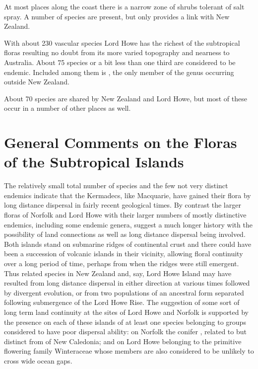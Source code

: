 At most places along the coast there is a narrow zone of shrubs tolerant of salt spray.
A number of species are present, but only  provides a link with New Zealand.

With about 230 vascular species Lord Howe has the richest of the subtropical floras resulting no doubt from its more varied topography and nearness to Australia.
About 75 species or a bit less than one third are considered to be endemic.
Included among them is , the only member of the genus occurring outside New Zealand.

About 70 species are shared by New Zealand and Lord Howe, but most of these occur in a number of other places as well.

\section{General Comments on the Floras of the Subtropical Islands}

The relatively small total number of species and the few not very distinct endemics indicate that the Kermadecs, like Macquarie, have gained their flora by long distance dispersal in fairly recent geological times.
By contrast the larger floras of Norfolk and Lord Howe with their larger numbers of mostly distinctive endemics, including some endemic genera, suggest a much longer history with the possibility of land connections as well as long distance dispersal being involved.
Both islands stand on submarine ridges of continental crust and there could have been a succession of volcanic islands in their vicinity, allowing floral continuity over a long period of time, perhaps from when the ridges were still emergent.
Thus related species in New Zealand and, say, Lord Howe Island may have resulted from long distance dispersal in either direction at various times followed by divergent evolution, or from two populations of an ancestral form separated following submergence of the Lord Howe Rise.
The suggestion of some sort of long term land continuity at the sites of Lord Howe and Norfolk is supported by the presence on each of these islands of at least one species belonging to groups considered to have poor dispersal ability: on Norfolk the conifer , related to but distinct from  of New Caledonia; and on Lord Howe  belonging to the primitive flowering family Winteraceae whose members are also considered to be unlikely to cross wide ocean gaps.

